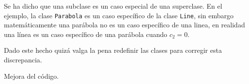 Se ha dicho que una subclase es un caso especial de una superclase. En
el ejemplo, la clase \texttt{Parabola} es un caso específico de la clase
\texttt{Line}, sin embargo matemáticamente una parábola no es un caso
específico de una linea, en realidad una línea es un caso específico de
una parábola cuando \(c_2 = 0\).

Dado este hecho quizá valga la pena redefinir las clases para corregir
esta discrepancia.\\

\begin{code} Mejora del código.
\begin{Shaded}
\begin{Highlighting}[]
     \NormalTok{(}
        \OperatorTok{=}\OperatorTok{=}

     \NormalTok{(}
         \OperatorTok{+} \OperatorTok{*}\OperatorTok{+} \OperatorTok{*}\OperatorTok{**}
    
\OperatorTok{=}\OperatorTok{=}\NormalTok{ [}\NormalTok{, }\NormalTok{], float\_format}\OperatorTok{=}\StringTok{\textquotesingle{}.6\textquotesingle{}}\NormalTok{)}
\OperatorTok{=} 
    
     \NormalTok{(}\NormalTok{):}
         \SpecialCharTok{\{}\SpecialCharTok{\}}\SpecialStringTok{ + }\SpecialCharTok{\{}\SpecialCharTok{\}}\SpecialCharTok{\{}\SpecialCharTok{\}}

     \NormalTok{(}
        \NormalTok{)}

\end{Highlighting}
\end{Shaded}
\end{code}

